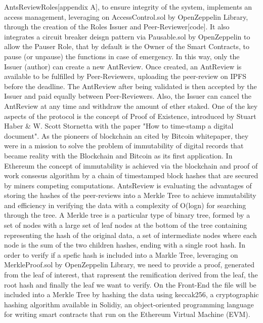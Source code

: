 \documentclass[runningheads]{llncs}
\begin{document}
AntsReviewRoles[appendix A], to ensure integrity of the system, implements an access management, leveraging on AccessControl.sol by OpenZeppelin Library, through the creation of the Roles Issuer and Peer-Reviewer[code].
\newline It also integrates a circuit breaker deisgn pattern via Pausable.sol by OpenZeppelin to allow the Pauser Role, that by default is the Owner of the Smart Contracts, to pause (or unpause) the functions in case of emergency.
\newline In this way, only the Issuer (author) can create a new AntReview.
\newline Once created, an AntReview is available to be fulfilled by Peer-Reviewers, uploading the peer-review on IPFS before the deadline.
\newline The AntReview after being validated is then accepted by the Issuer and paid equally between Peer-Reviewers.
\newline Also, the Issuer can cancel the AntReview at any time and withdraw the amount of ether staked.
\newline One of the key aspects of the protocol is the concept of Proof of Existence, introduced by Stuart Haber \& W. Scott Stornetta with the paper "How to time-stamp a digital document".
\newline As the pioneers of blockchain an cited by Bitcoin whitepaper, they were in a mission to solve the problem of immutability of digital records that became reality with the Blockchain and Bitcoin as its first application.
\newline In Ethereum the concept of immutability is achieved via the blockchain and proof of work consesus algorithm by a chain of timestamped block hashes that are secured by miners competing computations.
\newline AntsReview is evaluating the advantages of storing the hashes of the peer-reviews into a Merkle Tree to achieve immutability and efficiency in verifying the data with a complexity of O(logn) for searching through the tree.
\newline A Merkle tree is a particular type of binary tree, formed by a set of nodes with a large set of leaf nodes at the bottom of the tree containing representing the hash of the original data, a set of intermediate nodes where each node is the sum of the two children hashes, ending with a single root hash.
\newline In order to verify if a spefic hash is included into a Markle Tree, leveraging on MerkleProof.sol by OpenZeppelin Library, we need to provide a proof, generated from the leaf of interest, that rapresent the remification derived from the leaf, the root hash and finally the leaf we want to verify.
\newline On the Front-End the file will be included into a Merkle Tree by hashing the data using keccak256, a cryptographic hashing algorithm available in Solidiy, an object-oriented programming language for writing smart contracts that run on the Ethereum Virtual Machine (EVM).
\end{document}
